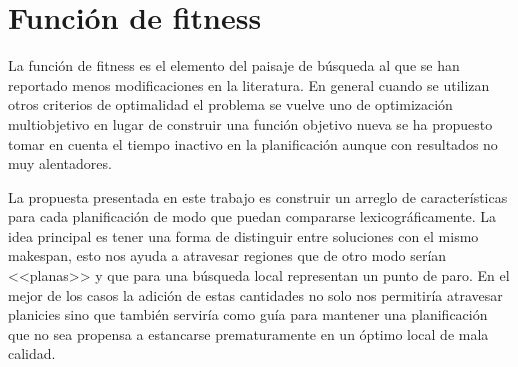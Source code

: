 \section{Función de fitness}\label{prop:fitness}
La función de fitness es el elemento del paisaje de búsqueda al que se han reportado menos modificaciones en la literatura. En general cuando se utilizan otros criterios de optimalidad el problema se vuelve uno de optimización multiobjetivo\cite{gong2019effective,sakawa2000fuzzy,ponnambalam2001multiobjective} en lugar de construir una función objetivo nueva se ha propuesto tomar en cuenta el tiempo inactivo en la planificación\cite{uckun1993managing} aunque con resultados no muy alentadores.   

La propuesta presentada en este trabajo es construir un arreglo de características para cada planificación de modo que puedan compararse lexicográficamente. La idea principal es tener una forma de distinguir entre soluciones con el mismo makespan, esto nos ayuda a atravesar regiones que de otro modo serían <<planas>> y que para una búsqueda local representan un punto de paro. En el mejor de los casos la adición de estas cantidades no solo nos permitiría atravesar planicies sino que también serviría como guía para mantener una planificación que no sea propensa a estancarse prematuramente en un óptimo local de mala calidad.\\


